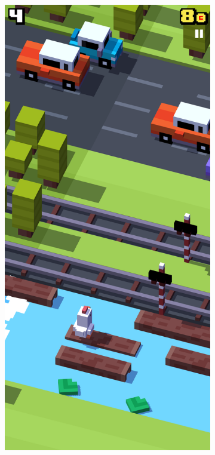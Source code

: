 \documentclass[12pt,a4paper]{report}
\begin{document}
\begin{figure}[bt]
\begin{subfigure}{.32\textwidth}
  \caption{}
  \label{fig:snap1}
\end{subfigure}%
\begin{subfigure}{.32\textwidth}
  \centering
  \includegraphics[width=.95\linewidth]{snapshot_river}

\end{subfigure}
\end{figure}
\end{document}
